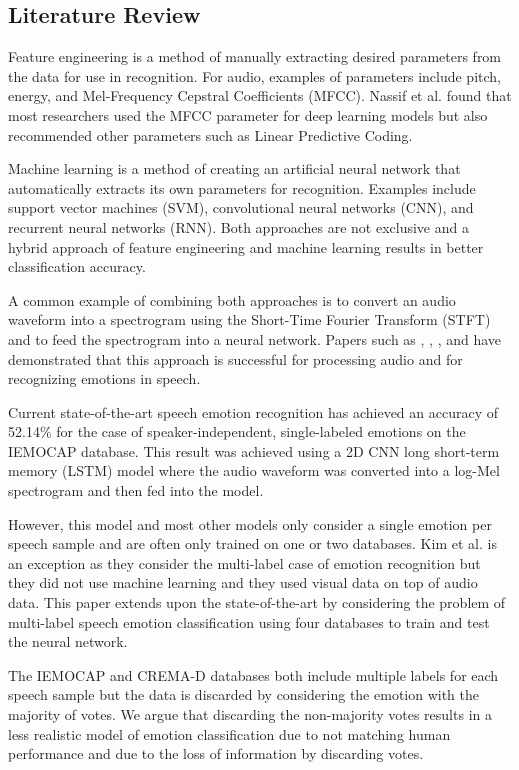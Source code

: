 \documentclass[conference]{IEEEtran}
\begin{document}
\subsection{Literature Review}

Feature engineering is a method of manually extracting desired parameters from the data for use in  recognition. For audio, examples of parameters include pitch, energy, and Mel-Frequency Cepstral Coefficients (MFCC).\cite{Rybka2013} Nassif et al. \cite{Nassif2019} found that most researchers used the MFCC parameter for deep learning models but also recommended other parameters such as Linear Predictive Coding. 

Machine learning is a method of creating an artificial neural network that automatically extracts its own parameters for recognition. Examples include support vector machines (SVM), convolutional neural networks (CNN), and recurrent neural networks (RNN). Both approaches are not exclusive and a hybrid approach of feature engineering and machine learning results in better classification accuracy.\cite{Nassif2019}

A common example of combining both approaches is to convert an audio waveform into a spectrogram using the Short-Time Fourier Transform (STFT) and to feed the spectrogram into a neural network. Papers such as \cite{Engel2019}, \cite{Chen2018}, \cite{Badshah2019}, and \cite{Zhao2019} have demonstrated that this approach is successful for processing audio and for recognizing emotions in speech.

Current state-of-the-art speech emotion recognition has achieved an accuracy of 52.14\% for the case of speaker-independent, single-labeled emotions on the IEMOCAP database.\cite{Zhao2019} This result was achieved using a 2D CNN long short-term memory (LSTM) model where the audio waveform was converted into a log-Mel spectrogram and then fed into the model.

However, this model and most other models only consider a single emotion per speech sample and are often only trained on one or two databases. Kim et al. \cite{Kim2018a} is an exception as they consider the multi-label case of emotion recognition but they did not use machine learning and they used visual data on top of audio data. This paper extends upon the state-of-the-art by considering the problem of multi-label speech emotion classification using four databases to train and test the neural network.

The IEMOCAP \cite{busso_2008} and CREMA-D \cite{cao_2014} databases both include multiple labels for each speech sample but the data is discarded by considering the emotion with the majority of votes. We argue that discarding the non-majority votes results in a less realistic model of emotion classification due to not matching human performance and due to the loss of information by discarding votes.
\end{document}
